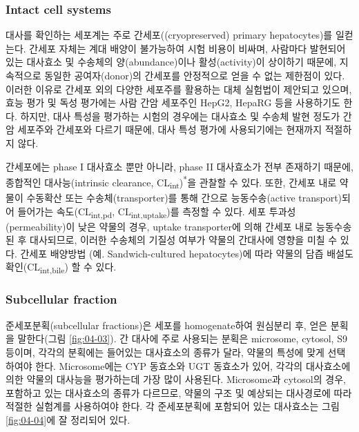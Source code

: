 \documentclass[
  11pt,
  krantz2, a4paper, twoside]{krantz}
\begin{document}
\hypertarget{intact-cell-systems}{%
\subsubsection{Intact cell systems}\label{intact-cell-systems}}

대사를 확인하는 세포계는 주로 간세포((cryopreserved) primary
hepatocytes)를 일컫는다. 간세포 자체는 계대 배양이 불가능하여 시험
비용이 비싸며, 사람마다 발현되어 있는 대사효소 및 수송체의
양(abundance)이나 활성(activity)이 상이하기 때문에, 지속적으로 동일한
공여자(donor)의 간세포를 안정적으로 얻을 수 없는 제한점이 있다. 이러한
이유로 간세포 외의 다양한 세포주를 활용하는 대체 실험법이 제안되고
있으며, 효능 평가 및 독성 평가에는 사람 간암 세포주인 HepG2, HepaRG 등을
사용하기도 한다. 하지만, 대사 특성을 평가하는 시험의 경우에는 대사효소
및 수송체 발현 정도가 간암 세포주와 간세포와 다르기 때문에, 대사 특성
평가에 사용되기에는 현재까지 적절하지 않다.

간세포에는 phase I 대사효소 뿐만 아니라, phase II 대사효소가 전부
존재하기 때문에, 종합적인 대사능(intrinsic clearance, CL\textsubscript{int})\textsuperscript{*}을
관찰할 수 있다. 또한, 간세포 내로 약물이 수동확산 또는
수송체(transporter)를 통해 간으로 능동수송(active transport)되어
들어가는 속도(CL\textsubscript{int,pd}, CL\textsubscript{int,uptake})를 측정할 수 있다. 세포
투과성(permeability)이 낮은 약물의 경우, uptake transporter에 의해
간세포 내로 능동수송 된 후 대사되므로, 이러한 수송체의 기질성 여부가
약물의 간대사에 영향을 미칠 수 있다. 간세포 배양방법 (예.
Sandwich-cultured hepatocytes)에 따라 약물의 담즙 배설도
확인(CL\textsubscript{int,bile}) 할 수 있다.

\hypertarget{subcellular-fraction}{%
\subsubsection{Subcellular fraction}\label{subcellular-fraction}}

준세포분획(subcellular fractions)은 세포를 homogenate하여 원심분리 후,
얻은 분획을 말한다(그림 \ref{fig:04-03}). 간 대사에 주로 사용되는 분획은 microsome,
cytosol, S9 등이며, 각각의 분획에는 들어있는 대사효소의 종류가 달라,
약물의 특성에 맞게 선택하여야 한다. Microsome에는 CYP 동효소와 UGT
동효소가 있어, 각각의 대사효소에 의한 약물의 대사능을 평가하는데 가장
많이 사용된다. Microsome과 cytosol의 경우, 포함하고 있는 대사효소의
종류가 다르므로, 약물의 구조 및 예상되는 대사경로에 따라 적절한 실험계를
사용하여야 한다. 각 준세포분획에 포함되어 있는 대사효소는 그림 \ref{fig:04-04}에 잘
정리되어 있다.
\end{document}
